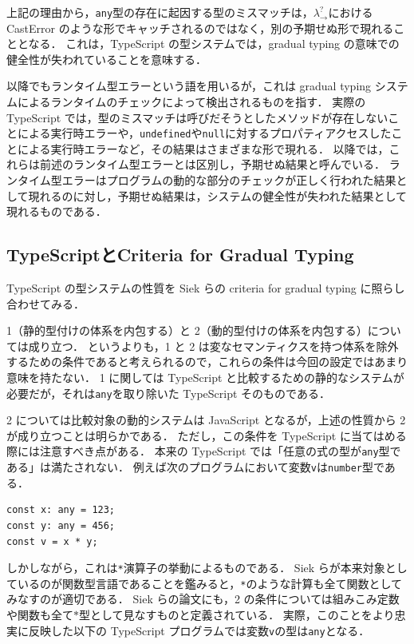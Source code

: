 上記の理由から，\texttt{any}型の存在に起因する型のミスマッチは，$\lambda^?_\to$における CastError のような形でキャッチされるのではなく，別の予期せぬ形で現れることとなる．
これは，TypeScript の型システムでは，gradual typing の意味での健全性が失われていることを意味する．

以降でもランタイム型エラーという語を用いるが，これは gradual typing システムによるランタイムのチェックによって検出されるものを指す．
実際の TypeScript では，型のミスマッチは呼びだそうとしたメソッドが存在しないことによる実行時エラーや，\texttt{undefined}や\texttt{null}に対するプロパティアクセスしたことによる実行時エラーなど，その結果はさまざまな形で現れる．
以降では，これらは前述のランタイム型エラーとは区別し，予期せぬ結果と呼んでいる．
ランタイム型エラーはプログラムの動的な部分のチェックが正しく行われた結果として現れるのに対し，予期せぬ結果は，システムの健全性が失われた結果として現れるものである．

\subsection{TypeScriptとCriteria for Gradual Typing}

TypeScript の型システムの性質を Siek らの criteria for gradual typing に照らし合わせてみる．

1（静的型付けの体系を内包する）と 2（動的型付けの体系を内包する）については成り立つ．
というよりも，1 と 2 は変なセマンティクスを持つ体系を除外するための条件であると考えられるので，これらの条件は今回の設定ではあまり意味を持たない．
1 に関しては TypeScript と比較するための静的なシステムが必要だが，それは\texttt{any}を取り除いた TypeScript そのものである．

2 については比較対象の動的システムは JavaScript となるが，上述の性質から 2 が成り立つことは明らかである．
ただし，この条件を TypeScript に当てはめる際には注意すべき点がある．
本来の TypeScript では「任意の式の型が\texttt{any}型である」は満たされない．
例えば次のプログラムにおいて変数\texttt{v}は\texttt{number}型である．

\begin{lstlisting}
const x: any = 123;
const y: any = 456;
const v = x * y;
\end{lstlisting}

しかしながら，これは\texttt{*}演算子の挙動によるものである．
Siek らが本来対象としているのが関数型言語であることを鑑みると，\texttt{*}のような計算も全て関数としてみなすのが適切である．
Siek らの論文にも，2 の条件については組みこみ定数や関数も全て$*$型として見なすものと定義されている．
実際，このことをより忠実に反映した以下の TypeScript プログラムでは変数\texttt{v}の型は\texttt{any}となる．

